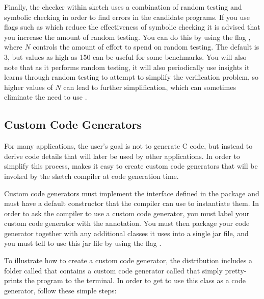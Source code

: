 Finally, the checker within sketch uses a combination of
random testing and symbolic checking in order to find errors in the
candidate programs. If you use flags such as  which
reduce the effectiveness of symbolic checking it is advised that you
increase the amount of random testing. You can do this by
using the flag , where $N$ controls the amount of
effort to spend on random testing. The default is 3, but values as high as 150
can be useful for some benchmarks. You will also note that as it performs
random testing, it will also periodically use insights it learns through
random testing to attempt to simplify the verification problem, so higher
values of $N$ can lead to further simplification, which can sometimes eliminate the
need to use .




\subsection{Custom Code Generators}

For many applications, the user's goal is not to generate C code, but instead to derive code details that will later be used by other applications. In order to simplify this process, \Sk{} makes it easy to create custom code generators that will be invoked by the sketch compiler at code generation time.

Custom code generators must implement the  interface defined in the  package and must have a default constructor that the compiler can use to instantiate them. In order to ask the compiler to use a custom code generator, you must label your custom code generator with the  annotation. You must then package your code generator together with any additional classes it uses into a single jar file, and you must tell \Sk{} to use this jar file by using the flag .



To illustrate how to create a custom code generator, the \Sk{} distribution includes a folder called  that contains a custom code generator called  that simply pretty-prints the program to the terminal. In order to get \Sk{} to use this class as a code generator, follow these simple steps:

